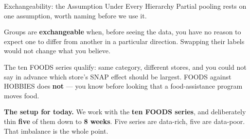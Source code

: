 \documentclass[aspectratio=169, 11pt]{beamer}
\begin{document}
\begin{frame}{Exchangeability: the Assumption Under Every Hierarchy}
  Partial pooling rests on one assumption, worth naming before we use it.

  \begin{definitionbox}[Exchangeable]
    Groups are \textbf{exchangeable} when, before seeing the data, you have no reason to expect
    one to differ from another in a particular direction. Swapping their labels would not change
    what you believe.
  \end{definitionbox}

  \vspace{0.1cm}
  The ten FOODS series qualify: same category, different stores, and you could not say in advance
  which store's SNAP effect should be largest. FOODS against HOBBIES does \textbf{not} --- you
  know before looking that a food-assistance program moves food.

  \vspace{0.15cm}
  \textbf{The setup for today.} We work with the \textbf{ten FOODS series}, and deliberately thin
  \textbf{five} of them down to \textbf{8 weeks}. Five series are data-rich, five are data-poor.
  That imbalance is the whole point.

  \vspace{0.1cm}
\end{frame}
\end{document}
